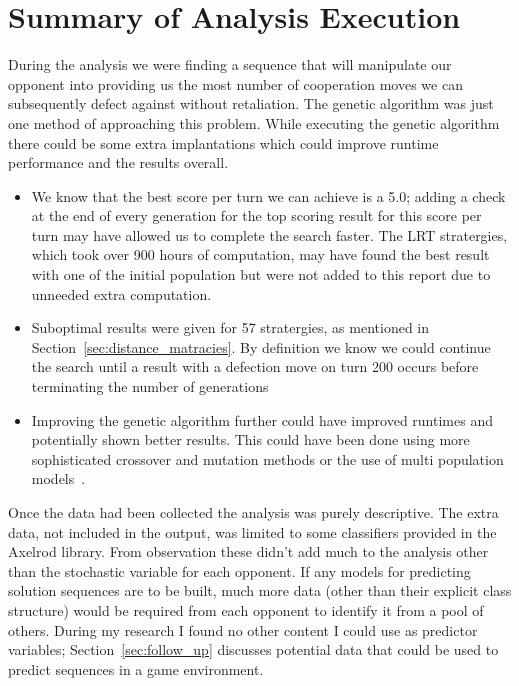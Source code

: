 
\section{Summary of Analysis Execution}\label{sec:conclusion_execution}
During the analysis we were finding a sequence that will manipulate our opponent into providing us the most number of cooperation moves we can subsequently defect against without retaliation.
The genetic algorithm was just one method of approaching this problem.
While executing the genetic algorithm there could be some extra implantations which could improve runtime performance and the results overall.
\begin{itemize}
    \item {We know that the best score per turn we can achieve is a 5.0; adding a check at the end of every generation for the top scoring result for this score per turn may have allowed us to complete the search faster.
    The LRT stratergies, which took over 900 hours of computation, may have found the best result with one of the initial population but were not added to this report due to unneeded extra computation.}
    \item {Suboptimal results were given for 57 stratergies, as mentioned in Section~\ref{sec:distance_matracies}.
    By definition we know we could continue the search until a result with a defection move on turn 200 occurs before terminating the number of generations} 
    \item {Improving the genetic algorithm further could have improved runtimes and potentially shown better results.
    This could have been done using more sophisticated crossover and mutation methods or the use of multi population models~\cite{whitley2012genetic}.}
\end{itemize}

Once the data had been collected the analysis was purely descriptive.
The extra data, not included in the output, was limited to some classifiers provided in the Axelrod library.
From observation these didn't add much to the analysis other than the stochastic variable for each opponent.
If any models for predicting solution sequences are to be built, much more data (other than their explicit class structure) would be required from each opponent to identify it from a pool of others.
During my research I found no other content I could use as predictor variables; Section~\ref{sec:follow_up} discusses potential data that could be used to predict sequences in a game environment.

